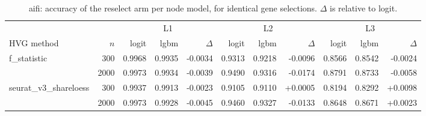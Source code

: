 \begin{table}[t]
\centering
\small
\begin{tabular}{lrrrrrrrrrr}
\toprule
 &  & \multicolumn{3}{c}{L1} & \multicolumn{3}{c}{L2} & \multicolumn{3}{c}{L3} \\
\cmidrule(lr){3-5}\cmidrule(lr){6-8}\cmidrule(lr){9-11}
HVG method & $n$ & logit & lgbm & $\Delta$ & logit & lgbm & $\Delta$ & logit & lgbm & $\Delta$ \\
\midrule
f\_statistic & 300 & 0.9968 & 0.9935 & -0.0034 & 0.9313 & 0.9218 & -0.0096 & 0.8566 & 0.8542 & -0.0024 \\
 & 2000 & 0.9973 & 0.9934 & -0.0039 & 0.9490 & 0.9316 & -0.0174 & 0.8791 & 0.8733 & -0.0058 \\
\addlinespace
seurat\_v3\_shareloess & 300 & 0.9937 & 0.9913 & -0.0023 & 0.9105 & 0.9110 & +0.0005 & 0.8194 & 0.8292 & +0.0098 \\
 & 2000 & 0.9973 & 0.9928 & -0.0045 & 0.9460 & 0.9327 & -0.0133 & 0.8648 & 0.8671 & +0.0023 \\
\bottomrule
\end{tabular}
\caption{aifi: accuracy of the reselect arm per node model, for identical gene selections. $\Delta$ is relative to logit.}
\label{tab:backend-aifi-accuracy}
\end{table}